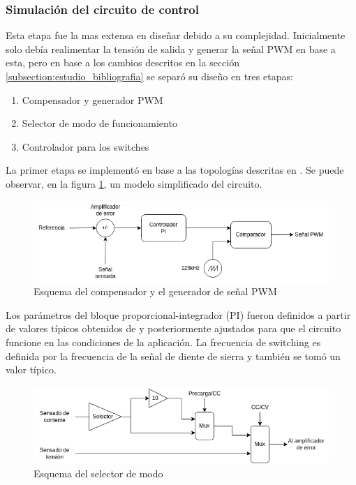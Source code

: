 
\subsubsection{Simulación del circuito de control}
Esta etapa fue la mas extensa en diseñar debido a su complejidad. Inicialmente solo debía realimentar la tensión de salida
y generar la señal PWM en base a esta, pero en base a los cambios descritos en la sección \ref{subsection:estudio_bibliografia}
se separó su diseño en tres etapas:

\begin{enumerate}
    \item Compensador y generador PWM
    \item Selector de modo de funcionamiento
    \item Controlador para los switches
\end{enumerate}

La primer etapa se implementó en base a las topologías descritas en \cite{mohan}. Se puede observar,
en la figura \ref{fig:esquema_compensador}, un modelo simplificado del circuito.

\begin{figure}
    \centering
    \includegraphics[width=\textwidth]{images/compensador.png}
    \caption{Esquema del compensador y el generador de señal PWM}
    \label{fig:esquema_compensador}
\end{figure}

Los parámetros del bloque proporcional-integrador (PI) fueron definidos a partir de valores típicos obtenidos de \cite{mohan}
y posteriormente ajustados para que el circuito funcione en las condiciones de la aplicación.
La frecuencia de switching es definida por la frecuencia de la señal de diente de sierra y también se tomó un valor típico.

\begin{figure}
    \centering
    \includegraphics[width=\textwidth]{images/selector.png}
    \caption{Esquema del selector de modo}
    \label{fig:esquema_selector}
\end{figure}

